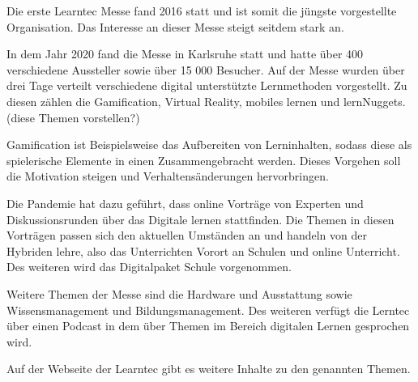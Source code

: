 Die erste Learntec Messe fand 2016 statt und ist somit die jüngste vorgestellte Organisation. Das Interesse an dieser Messe steigt seitdem stark an.
\autocite[Vgl.]{KarlsruherMesseundKongressGmbH.3232021} 

In dem Jahr 2020 fand die Messe in Karlsruhe statt und hatte über 400 verschiedene Aussteller sowie über 15 000 Besucher. Auf der Messe wurden über drei Tage verteilt verschiedene digital unterstützte Lernmethoden vorgestellt. Zu diesen zählen die Gamification, Virtual Reality, mobiles lernen und lernNuggets.  (diese Themen vorstellen?) \autocite{KarlsruherMesseundKongressGmbH.3232021}

Gamification ist Beispielsweise das Aufbereiten von Lerninhalten, sodass diese als spielerische Elemente in einen Zusammengebracht werden. Dieses Vorgehen soll die Motivation steigen und Verhaltensänderungen hervorbringen. \autocite{Prof.Dr.OliverBendel.7.1.2019}

Die Pandemie hat dazu geführt, dass online Vorträge von Experten und Diskussionsrunden über das Digitale lernen stattfinden. Die Themen in diesen Vorträgen passen sich den aktuellen Umständen an und handeln von der Hybriden lehre, also das Unterrichten Vorort an Schulen und online Unterricht. Des weiteren wird das Digitalpaket Schule vorgenommen. \autocite{KarlsruherMesseundKongressGmbH.3232021b} 

Weitere Themen der Messe sind die Hardware und Ausstattung sowie Wissensmanagement und Bildungsmanagement. Des weiteren verfügt die Lerntec über einen Podcast in dem über Themen im Bereich digitalen Lernen gesprochen wird.\autocite{KarlsruherMesseundKongressGmbH.432021} 

Auf der Webseite der Learntec gibt es weitere Inhalte zu den genannten Themen. 
